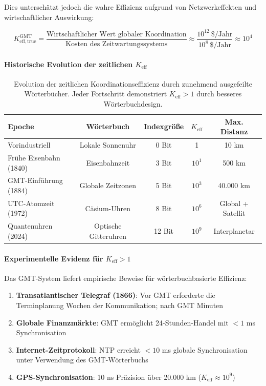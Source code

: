 \documentclass[11pt,a4paper]{article}
\begin{document}
	Dies unterschätzt jedoch die wahre Effizienz aufgrund von Netzwerkeffekten und wirtschaftlicher Auswirkung:
	
	\begin{equation}
		K_{\mathrm{eff, true}}^{\mathrm{GMT}} = \frac{\text{Wirtschaftlicher Wert globaler Koordination}}{\text{Kosten des Zeitwartungssystems}} \approx \frac{10^{12}\ \text{\$/Jahr}}{10^8\ \text{\$/Jahr}} \approx 10^4
	\end{equation}
	
	\paragraph{Historische Evolution der zeitlichen $K_{\mathrm{eff}}$}
	\begin{table}[htbp]
		\centering
		\begin{tabular}{lcccc}
			\toprule
			\textbf{Epoche} & \textbf{Wörterbuch} & \textbf{Indexgröße} & \textbf{$K_{\mathrm{eff}}$} & \textbf{Max. Distanz} \\
			\midrule
			Vorindustriell & Lokale Sonnenuhr & 0 Bit & 1 & 10 km \\
			Frühe Eisenbahn (1840) & Eisenbahnzeit & 3 Bit & $10^1$ & 500 km \\
			GMT-Einführung (1884) & Globale Zeitzonen & 5 Bit & $10^3$ & 40.000 km \\
			UTC-Atomzeit (1972) & Cäsium-Uhren & 8 Bit & $10^6$ & Global + Satellit \\
			Quantenuhren (2024) & Optische Gitteruhren & 12 Bit & $10^9$ & Interplanetar \\
			\bottomrule
		\end{tabular}
		\caption{Evolution der zeitlichen Koordinationseffizienz durch zunehmend ausgefeilte Wörterbücher. Jeder Fortschritt demonstriert $K_{\mathrm{eff}} > 1$ durch besseres Wörterbuchdesign.}
		\label{tab:time-keff-evolution}
	\end{table}
	
	\paragraph{Experimentelle Evidenz für $K_{\mathrm{eff}} > 1$}
	Das GMT-System liefert empirische Beweise für wörterbuchbasierte Effizienz:
	
	\begin{enumerate}
		\item \textbf{Transatlantischer Telegraf (1866)}: Vor GMT erforderte die Terminplanung Wochen der Kommunikation; nach GMT Minuten
		
		\item \textbf{Globale Finanzmärkte}: GMT ermöglicht 24-Stunden-Handel mit $<1$ ms Synchronisation
		
		\item \textbf{Internet-Zeitprotokoll}: NTP erreicht $<10$ ms globale Synchronisation unter Verwendung des GMT-Wörterbuchs
		
		\item \textbf{GPS-Synchronisation}: 10 ns Präzision über 20.000 km ($K_{\mathrm{eff}} \approx 10^9$)
	\end{enumerate}
	
\end{document}
